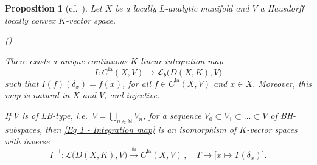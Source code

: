 \documentclass[a4paper, reqno, 10pt]{amsart}
\newtheorem{proposition}[theorem]{Proposition}
\theoremstyle{definition}
\newenvironment{altenumerate}
	{\begin{list}
		{\textup{(\theenumi)} }
		{\usecounter{enumi}
			\setlength{\labelwidth}{0pt}
			\setlength{\labelsep}{0pt}
			\setlength{\leftmargin}{0pt}
			\setlength{\itemsep}{0pt}
			\setlength{\topsep}{0pt}
		\renewcommand{\theenumi}{\roman{enumi}}
		}}
	{\end{list}}
\numberwithin{equation}{section}
\newcommand{\la}{{\mathrm{la}}}
\newcommand{\lra}{\longrightarrow}
\newcommand{\lto}{\longmapsto}
\newcommand{\mto}{\mapsto}
\newcommand{\BN}{{\mathbb {N}}}
\newcommand{\CL}{{\mathcal {L}}}
\begin{document}
\begin{proposition}[{cf.\ \cite[Thm.\ 2.2]{SchneiderTeitelbaum02LocAnDistApplToGL2}}]\label{Prop 1 - Integration map}
	Let $X$ be a locally $L$-analytic manifold and $V$ a Hausdorff locally convex $K$-vector space.
	\begin{altenumerate}
		\item
		There exists a unique continuous $K$-linear \textit{integration map}
		\begin{equation}\label{Eq 1 - Integration map}
			I \colon C^\la (X,V) \lra \CL_b \big(D(X,K),V \big)
		\end{equation}
		such that $I(f)(\delta_x) = f(x)$, for all $f\in C^\la (X,V)$ and $x \in X$.
		Moreover, this map is natural in $X$ and $V$, and injective.
		\item
		If $V$ is of LB-type, i.e.\ $V = \bigcup_{n\in \BN} V_n$, for a sequence $V_0 \subset V_1 \subset \ldots \subset V$ of BH-subspaces, then \eqref{Eq 1 - Integration map} is an isomorphism of $K$-vector spaces with inverse 
		\begin{equation*}
			I^{-1} \colon \CL \big(D(X,K),V \big) \overset{\cong}{\lra} C^\la (X,V) \,,\quad T \lto \big[x \mto T(\delta_x) \big] .
		\end{equation*}
	\end{altenumerate}
\end{proposition}
\end{document}
